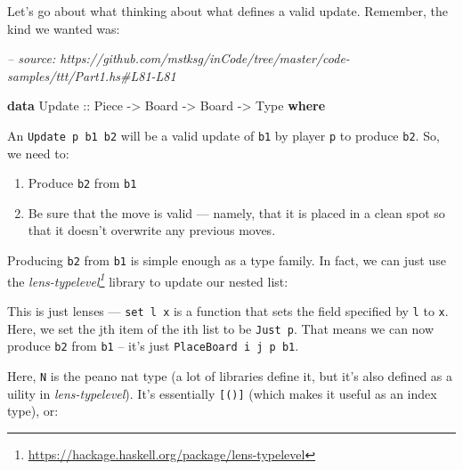 \documentclass[]{article}
\newenvironment{Shaded}{}{}
\newcommand{\CommentTok}[1]{\textcolor[rgb]{0.38,0.63,0.69}{\textit{#1}}}
\newcommand{\DataTypeTok}[1]{\textcolor[rgb]{0.56,0.13,0.00}{#1}}
\newcommand{\FunctionTok}[1]{\textcolor[rgb]{0.02,0.16,0.49}{#1}}
\newcommand{\KeywordTok}[1]{\textcolor[rgb]{0.00,0.44,0.13}{\textbf{#1}}}
\newcommand{\NormalTok}[1]{#1}
\newcommand{\OtherTok}[1]{\textcolor[rgb]{0.00,0.44,0.13}{#1}}
\renewcommand{\href}[2]{#2\footnote{\url{#1}}}
\begin{document}
Let's go about what thinking about what defines a valid update. Remember, the
kind we wanted was:

\begin{Shaded}
\begin{Highlighting}[]
\CommentTok{-- source: https://github.com/mstksg/inCode/tree/master/code-samples/ttt/Part1.hs#L81-L81}

\KeywordTok{data} \DataTypeTok{Update}\OtherTok{ ::} \DataTypeTok{Piece} \OtherTok{->} \DataTypeTok{Board} \OtherTok{->} \DataTypeTok{Board} \OtherTok{->} \DataTypeTok{Type} \KeywordTok{where}
\end{Highlighting}
\end{Shaded}

An \texttt{Update\ p\ b1\ b2} will be a valid update of \texttt{b1} by player
\texttt{p} to produce \texttt{b2}. So, we need to:

\begin{enumerate}
\def\labelenumi{\arabic{enumi}.}
\tightlist
\item
  Produce \texttt{b2} from \texttt{b1}
\item
  Be sure that the move is valid --- namely, that it is placed in a clean spot
  so that it doesn't overwrite any previous moves.
\end{enumerate}

Producing \texttt{b2} from \texttt{b1} is simple enough as a type family. In
fact, we can just use the
\emph{\href{https://hackage.haskell.org/package/lens-typelevel}{lens-typelevel}}
library to update our nested list:

\begin{Shaded}
\end{Shaded}

This is just lenses --- \texttt{set\ l\ x} is a function that sets the field
specified by \texttt{l} to \texttt{x}. Here, we set the jth item of the ith list
to be \texttt{Just\ p}. That means we can now produce \texttt{b2} from
\texttt{b1} -- it's just \texttt{PlaceBoard\ i\ j\ p\ b1}.

Here, \texttt{N} is the peano nat type (a lot of libraries define it, but it's
also defined as a uility in \emph{lens-typelevel}). It's essentially
\texttt{{[}(){]}} (which makes it useful as an index type), or:
\end{document}
